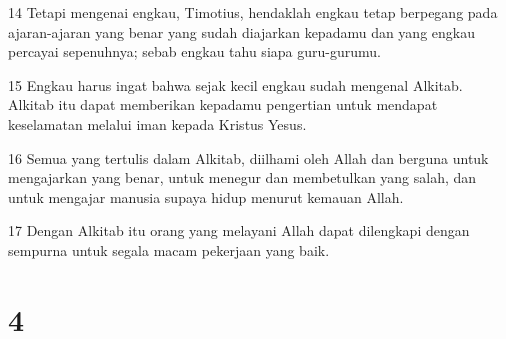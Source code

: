 \par 14 Tetapi mengenai engkau, Timotius, hendaklah engkau tetap berpegang pada ajaran-ajaran yang benar yang sudah diajarkan kepadamu dan yang engkau percayai sepenuhnya; sebab engkau tahu siapa guru-gurumu.
\par 15 Engkau harus ingat bahwa sejak kecil engkau sudah mengenal Alkitab. Alkitab itu dapat memberikan kepadamu pengertian untuk mendapat keselamatan melalui iman kepada Kristus Yesus.
\par 16 Semua yang tertulis dalam Alkitab, diilhami oleh Allah dan berguna untuk mengajarkan yang benar, untuk menegur dan membetulkan yang salah, dan untuk mengajar manusia supaya hidup menurut kemauan Allah.
\par 17 Dengan Alkitab itu orang yang melayani Allah dapat dilengkapi dengan sempurna untuk segala macam pekerjaan yang baik.

\chapter{4}

